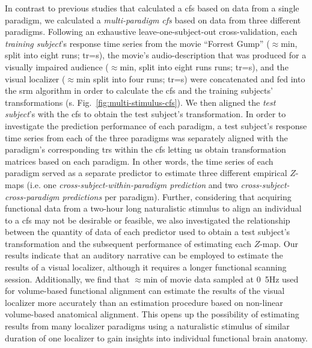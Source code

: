In contrast to previous studies \citep{jiahui2020predicting,
guntupalli2016model, haxby2011common} that calculated a \ac{cfs} based on data
from a single paradigm, we calculated a \textit{multi-paradigm \ac{cfs}} based
on data from three different paradigms.
Following an exhaustive leave-one-subject-out cross-validation, each
\textit{training subject}'s response time series from
%
the movie ``Forrest Gump'' ($\approx$\unit[120]{min}, split into eight runs;
\ac{tr}=\unit[2]{s}),
%
the movie's audio-description that was produced for a visually impaired audience
($\approx$\unit[120]{min}, split into eight runs runs; \ac{tr}=\unit[2]{s}), and
%
the visual localizer ($\approx$\unit[20]{min} split into four runs;
\ac{tr}=\unit[2]{s})
%
were concatenated and fed into the \ac{srm} algorithm in order to calculate the
\ac{cfs} and the training subjects' transformations (s.
Fig.~\ref{fig:multi-stimulus-cfs}).
We then aligned the \textit{test subject}'s with the \ac{cfs} to obtain the test
subject's transformation.
%
In order to investigate the prediction performance of each paradigm, a test
subject's response time series from each of the three paradigms was separately
aligned with the paradigm's corresponding \acp{tr} within the \ac{cfs} letting
us obtain transformation matrices based on each paradigm.
%
In other words, the time series of each paradigm served as a separate predictor
to estimate three different empirical $Z$-maps (i.e. one
\textit{cross-subject-within-paradigm prediction} and two
\textit{cross-subject-cross-paradigm predictions} per paradigm).
%
Further, considering that acquiring functional data from a two-hour long
naturalistic stimulus to align an individual to a \ac{cfs} may not be desirable
or feasible, we also investigated the relationship between the quantity of data
of each predictor used to obtain a test subject's transformation and the
subsequent performance of estimating each $Z$-map.
%
Our results indicate that an auditory narrative can be employed to estimate the
results of a visual localizer, although it requires a longer functional scanning
session.
%
Additionally, we find that $\approx$\unit[15]{min} of movie data sampled at
\unit{0.5}{Hz} used for volume-based functional alignment can estimate the
results of the visual localizer more accurately than an estimation procedure
based on non-linear volume-based anatomical alignment.
%
This opens up the possibility of estimating results from many localizer
paradigms using a naturalistic stimulus of similar duration of one
localizer to gain insights into individual functional brain anatomy.



